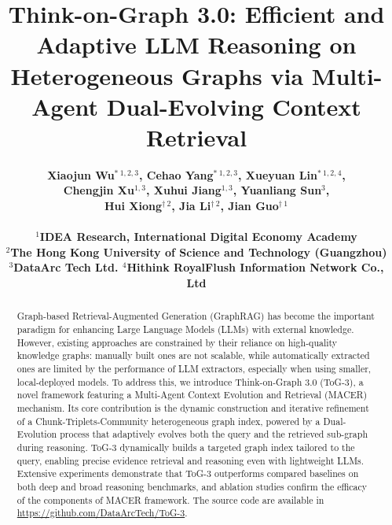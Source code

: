\documentclass[11pt]{article}
\title{Think-on-Graph 3.0: Efficient and Adaptive LLM Reasoning on Heterogeneous Graphs via Multi-Agent Dual-Evolving Context Retrieval}
\author{
\bf Xiaojun Wu$^{\ast\ 1,2,3}$,
Cehao Yang$^{\ast\ 1,2,3}$,
Xueyuan Lin$^{\ast\ 1,2,4}$, \\
\bf Chengjin Xu$^{1,3}$, 
Xuhui Jiang$^{1,3}$,
Yuanliang Sun$^{3}$, \\
\bf Hui Xiong$^{\dagger\ 2}$,
Jia Li$^{\dagger\ 2}$,
Jian Guo$^{\dagger\ 1}$
\\
\\
$^{1}$IDEA Research, International Digital Economy Academy \\
$^{2}$The Hong Kong University of Science and Technology (Guangzhou) \\
$^{3}$DataArc Tech Ltd. \quad
$^{4}$Hithink RoyalFlush Information Network Co., Ltd \\
}
\begin{document}
\maketitle
{
  \renewcommand{\thefootnote}%
    {\fnsymbol{footnote}}
}

\begin{abstract}
Graph-based Retrieval-Augmented Generation (GraphRAG) has become the important paradigm for enhancing Large Language Models (LLMs) with external knowledge. 
However, existing approaches are constrained by their reliance on high-quality knowledge graphs: manually built ones are not scalable, while automatically extracted ones are limited by the performance of LLM extractors, especially when using smaller, local-deployed models.
To address this, we introduce Think-on-Graph 3.0 (ToG-3), a novel framework featuring a Multi-Agent Context Evolution and Retrieval (MACER) mechanism. Its core contribution is the dynamic construction and iterative refinement of a Chunk-Triplets-Community heterogeneous graph index, powered by a Dual-Evolution process that adaptively evolves both the query and the retrieved sub-graph during reasoning. ToG-3 dynamically builds a targeted graph index tailored to the query, enabling precise evidence retrieval and reasoning even with lightweight LLMs.
Extensive experiments demonstrate that ToG-3 outperforms compared baselines on both deep and broad reasoning benchmarks, and ablation studies confirm the efficacy of the components of MACER framework. 
The source code are available in \url{https://github.com/DataArcTech/ToG-3}.
\end{abstract}

\label{sec:introduction}



\end{document}
